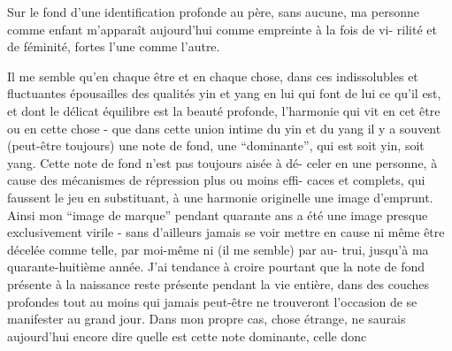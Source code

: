 Sur le fond d'une identification profonde au père, sans  aucune,
ma personne comme enfant m'apparaît aujourd'hui comme empreinte à la fois de vi-\newline
rilité et de féminité, fortes l'une comme l'autre.

Il me semble qu'en chaque être et en chaque chose, dans ces indissolubles
et fluctuantes épousailles des qualités yin et yang en lui qui font de lui ce
qu'il est, et dont le délicat équilibre est la beauté profonde, l'harmonie qui
vit en cet être ou en cette chose - que dans cette union intime du yin et du
yang il y a souvent (peut-être toujours) une note de fond, une ``dominante'',
qui est soit yin, soit yang. Cette note de fond n'est pas toujours aisée à dé-\newline
celer en une personne, à cause des mécanismes de répression plus ou moins effi-\newline
caces et complets, qui faussent le jeu en substituant, à une harmonie originelle
une image d'emprunt. Ainsi mon ``image de marque'' pendant quarante ans a été une
image presque exclusivement virile - sans d'ailleurs jamais se voir mettre en
cause ni même être décelée comme telle, par moi-même ni (il me semble) par au-\newline
trui, jusqu'à ma quarante-huitième année. J'ai tendance à croire pourtant que
la note de fond présente à la naissance reste présente pendant la vie entière,
dans des couches profondes tout au moins qui jamais peut-être ne trouveront
l'occasion de se manifester au grand jour. Dans mon propre cas, chose étrange, 
ne saurais aujourd'hui encore dire quelle est cette note dominante, celle donc

